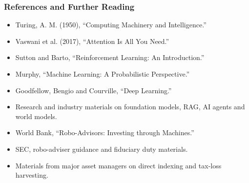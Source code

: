 \documentclass[aspectratio=169,12pt]{beamer}
\newcommand{\currentframetitle}{}
\newcommand{\slideTitle}[1]{\gdef\currentframetitle{#1}\frametitle{#1}}
\begin{document}
\begin{frame}
\slideTitle{References and Further Reading}
\scriptsize
\begin{itemize}
  \item Turing, A. M. (1950), ``Computing Machinery and Intelligence.''
  \item Vaswani et al. (2017), ``Attention Is All You Need.''
  \item Sutton and Barto, ``Reinforcement Learning: An Introduction.''
  \item Murphy, ``Machine Learning: A Probabilistic Perspective.''
  \item Goodfellow, Bengio and Courville, ``Deep Learning.''
  \item Research and industry materials on foundation models, RAG, AI agents and world models.
  \item World Bank, ``Robo-Advisors: Investing through Machines.''
  \item SEC, robo-adviser guidance and fiduciary duty materials.
  \item Materials from major asset managers on direct indexing and tax-loss harvesting.
\end{itemize}
\end{frame}
\end{document}

